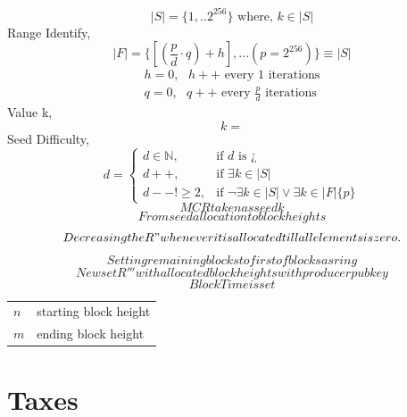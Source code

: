 \documentclass[a4paper,10pt]{article}
\makeatletter
\newenvironment{conditions}
  {\par\vspace{\abovedisplayskip}\noindent\begin{tabular}{>{$}l<{$} @{${}={}$} l}}
  {\end{tabular}\par\vspace{\belowdisplayskip}}
\makeatother
\begin{document}
\begin{equation*}
|S|= \{1,..2^{256}\} \text{ where, } k \in |S|
\end{equation*}
\noindent Range Identify,
\begin{equation*}
|F| = \{[(\frac{p}{d} \cdot q)+h],...(p=2^{256})\} \equiv |S|
\end{equation*}
\begin{align*}
h = 0, \text{ } h++ \text{ every } 1 \text{ iterations}\\
q = 0, \text{ } q++ \text{ every } \frac{p}{d} \text{ iterations}
\end{align*}
Value k,
\begin{equation*}
k =
\end{equation*}
\noindent Seed Difficulty,
\begin{equation*}
d = \begin{cases}
d \in \mathbb{N}, & \text{if } d \text{ is } ¿    \\
d++, & \text{if } \exists k \in |S|\\
d-- !\geq 2, & \text{if } \neg \exists k \in |S| \vee \exists k \in |F|\{p\}
\end{cases}
\end{equation*}
\begin{equation*}
MCR taken as seed k
\end{equation*}
\begin{equation*}
From seed allocation to block heights
\end{equation*}
\begin{equation*}
Decreasing the R" whenever it is allocated till all elements is zero.
\end{equation*}
\begin{equation*}
Setting remaining blocks to first of blocks as ring
\end{equation*}
\begin{equation*}
New set R''' with allocated block heights with producer pubkey
\end{equation*}
\begin{equation*}
Block Time is set
\end{equation*}

\begin{conditions}
n & starting block height\\
m & ending block height\\
\end{conditions}
\section{Taxes}
%
\end{document}
